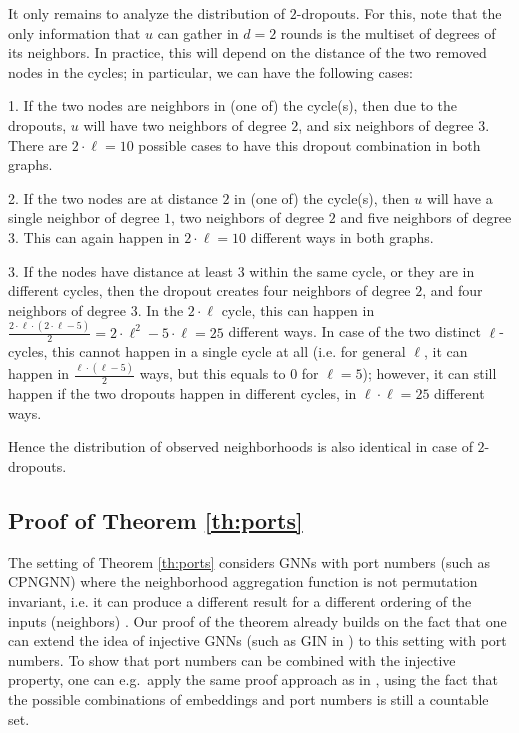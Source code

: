 \documentclass{article}
\begin{document}
It only remains to analyze the distribution of $2$-dropouts. For this, note that the only information that $u$ can gather in $d=2$ rounds is the multiset of degrees of its neighbors. In practice, this will depend on the distance of the two removed nodes in the cycles; in particular, we can have the following cases:

1. If the two nodes are neighbors in (one of) the cycle(s), then due to the dropouts, $u$ will have two neighbors of degree $2$, and six neighbors of degree $3$. There are $2 \cdot \ell = 10$ possible cases to have this dropout combination in both graphs.

2. If the two nodes are at distance $2$ in (one of) the cycle(s), then $u$ will have a single neighbor of degree $1$, two neighbors of degree $2$ and five neighbors of degree $3$. This can again happen in $2 \cdot \ell = 10$ different ways in both graphs.

3. If the nodes have distance at least $3$ within the same cycle, or they are in different cycles, then the dropout creates four neighbors of degree $2$, and four neighbors of degree $3$. In the $2 \cdot \ell$ cycle, this can happen in $\frac{2 \cdot \ell \cdot (2 \cdot \ell - 5)}{2} = 2 \cdot \ell^2 - 5 \cdot \ell = 25$ different ways. In case of the two distinct $\ell$-cycles, this cannot happen in a single cycle at all (i.e. for general $\ell$, it can happen in $\frac{\ell \cdot (\ell - 5)}{2}$ ways, but this equals to $0$ for $\ell=5$); however, it can still happen if the two dropouts happen in different cycles, in $\ell \cdot \ell = 25$ different ways.

Hence the distribution of observed neighborhoods is also identical in case of $2$-dropouts.

\subsection{Proof of Theorem \ref{th:ports}}

The setting of Theorem \ref{th:ports} considers GNNs with port numbers (such as CPNGNN) where the neighborhood aggregation function is not permutation invariant, i.e. it can produce a different result for a different ordering of the inputs (neighbors) \citep{ports}. Our proof of the theorem already builds on the fact that one can extend the idea of injective GNNs (such as GIN in \citep{GIN}) to this setting with port numbers. To show that port numbers can be combined with the injective property, one can e.g.\ apply the same proof approach as in \citep{GIN}, using the fact that the possible combinations of embeddings and port numbers is still a countable set.
\end{document}
